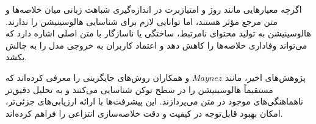 اگرچه معیارهایی مانند روژ و امتیازبرت در اندازه‌گیری شباهت زبانی میان خلاصه‌ها و متن مرجع مؤثر هستند، اما توانایی لازم برای شناسایی هالوسینیشن را ندارند. هالوسینیشن به تولید محتوای نامرتبط، ساختگی یا ناسازگار با متن اصلی اشاره دارد که می‌تواند وفاداری خلاصه‌ها را کاهش دهد و اعتماد کاربران به خروجی مدل را به چالش بکشد.


پژوهش‌های اخیر، مانند $Maynez$ و همکاران روش‌های جایگزینی را معرفی کرده‌اند که مستقیماً هالوسینیشن را در سطح توکن شناسایی می‌کنند و به تحلیل دقیق‌تر ناهماهنگی‌های موجود در متن می‌پردازند. این پیشرفت‌ها با ارائه ارزیابی‌های جزئی‌تر، امکان بهبود قابل‌توجه در کیفیت و دقت خلاصه‌سازی انتزاعی را فراهم کرده‌اند\cite{maynez-etal-2020-faithfulness}.










